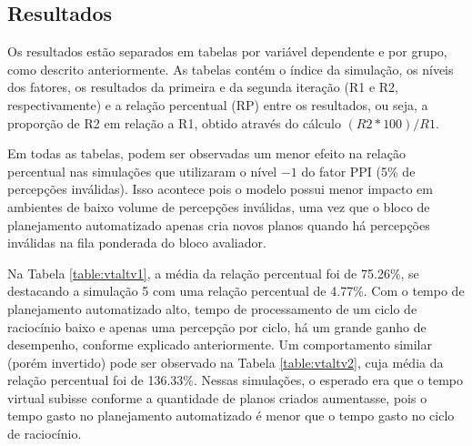 \subsection{Resultados}

Os resultados estão separados em tabelas por variável dependente e por grupo, como descrito anteriormente. As tabelas contém o índice da simulação, os níveis dos fatores, os resultados da primeira e da segunda iteração (R1 e R2, respectivamente) e a relação percentual (RP) entre os resultados, ou seja, a proporção de R2 em relação a R1, obtido através do cálculo $(R2 * 100) / R1$.

Em todas as tabelas, podem ser observadas um menor efeito na relação percentual nas simulações que utilizaram o nível $-1$ do fator PPI (5\% de percepções inválidas). Isso acontece pois o modelo possui menor impacto em ambientes de baixo volume de percepções inválidas, uma vez que o bloco de planejamento automatizado apenas cria novos planos quando há percepções inválidas na fila ponderada do bloco avaliador.

Na Tabela \ref{table:vtaltv1}, a média da relação percentual foi de 75.26\%, se destacando a simulação 5 com uma relação percentual de 4.77\%. Com o tempo de planejamento automatizado alto, tempo de processamento de um ciclo de raciocínio baixo e apenas uma percepção por ciclo, há um grande ganho de desempenho, conforme explicado anteriormente. Um comportamento similar (porém invertido) pode ser observado na Tabela \ref{table:vtaltv2}, cuja média da relação percentual foi de 136.33\%. Nessas simulações, o esperado era que o tempo virtual subisse conforme a quantidade de planos criados aumentasse, pois o tempo gasto no planejamento automatizado é menor que o tempo gasto no ciclo de raciocínio.

